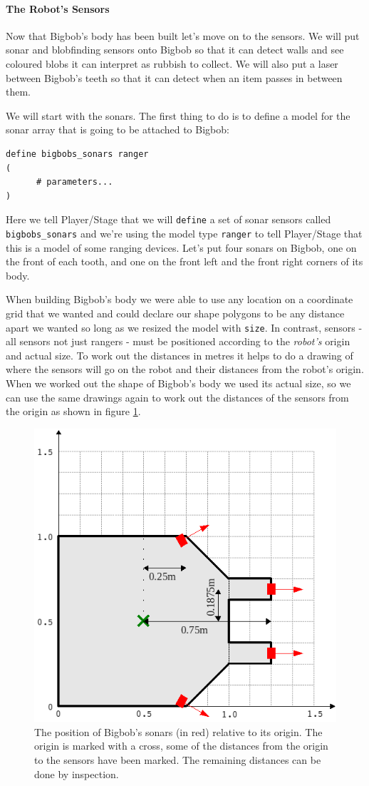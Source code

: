 \documentclass[a4paper]{report}
\newcommand{\plst}{Player/Stage\xspace}
\begin{document}
\paragraph{The Robot's Sensors}\label{sec:examplerobotsensors}
Now that Bigbob's body has been built let's move on to the sensors. We will put sonar and blobfinding sensors onto Bigbob so that it can detect walls and see coloured blobs it can interpret as rubbish to collect. We will also put a laser between Bigbob's teeth so that it can detect when an item passes in between them.

We will start with the sonars. The first thing to do is to define a model for the sonar array that is going to be attached to Bigbob:
\begin{verbatim}
define bigbobs_sonars ranger
(
      # parameters...
)
\end{verbatim}
Here we tell \plst that we will \verb|define| a set of sonar sensors called \verb|bigbobs_sonars| and we're using the model type \verb|ranger| to tell \plst that this is a model of some ranging devices. Let's put four sonars on Bigbob, one on the front of each tooth, and one on the front left and the front right corners of its body. 

When building Bigbob's body we were able to use any location on a coordinate grid that we wanted and could declare our shape polygons to be any distance apart we wanted so long as we resized the model with \verb|size|. In contrast, sensors - all sensors not just rangers - must be positioned according to the \emph{robot's} origin and actual size. To work out the distances in metres it helps to do a drawing of where the sensors will go on the robot and their distances from the robot's origin. When we worked out the shape of Bigbob's body we used its actual size, so we can use the same drawings again to work out the distances of the sensors from the origin as shown in figure \ref{fig:sonardrawing}.

\begin{figure}
	\centering
	\includegraphics[width=0.6\linewidth]{./pics/robot_building/bigbob_sonars.png} 
	\caption{The position of Bigbob's sonars (in red) relative to its origin. The origin is marked with a cross, some of the distances from the origin to the sensors have been marked. The remaining distances can be done by inspection.}
	\label{fig:sonardrawing}
\end{figure}
\end{document}
